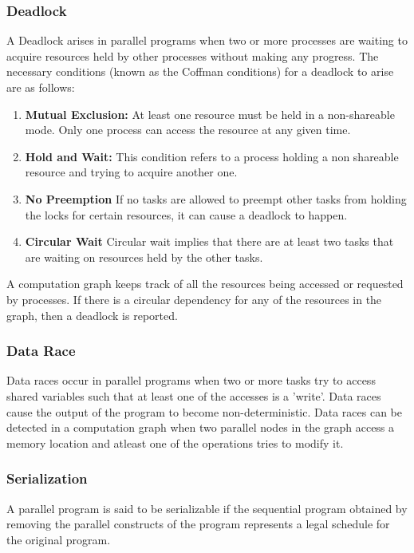 \subsubsection{Deadlock}
A Deadlock arises in parallel programs when two or more processes are waiting to acquire resources held by other processes without making any progress. The necessary conditions (known as the Coffman conditions) for a deadlock to arise are as follows:
\begin{enumerate}
\item 
\textbf{Mutual Exclusion:} At least one resource must be held in a non-shareable mode. Only one process can access the resource at any given time. 
\item
\textbf{Hold and Wait:} This condition refers to a process holding a non shareable resource and trying to acquire another one.
\item
\textbf{No Preemption}
If no tasks are allowed to preempt other tasks from holding the locks for certain resources, it can cause a deadlock to happen.
\item
\textbf{Circular Wait} Circular wait implies that there are at least two tasks that are waiting on resources held by the other tasks.
\end{enumerate}

A computation graph keeps track of all the resources being accessed or requested by processes. If there is a circular dependency for any of the resources in the graph, then a deadlock is reported.

\subsubsection{Data Race}
Data races occur in parallel programs when two or more tasks try to access shared variables such that at least one of the accesses is a 'write'. Data races cause the output of the program to become non-deterministic. Data races can be detected in a computation graph when two parallel nodes in the graph access a memory location and atleast one of the operations tries to modify it.
\subsubsection{Serialization}
A parallel program is said to be serializable if the sequential program obtained by removing the parallel constructs of the program represents a legal schedule for the original program.

